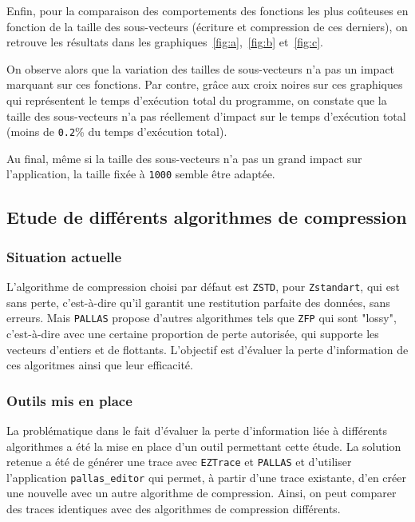 Enfin, pour la comparaison des comportements des fonctions les plus coûteuses en fonction de la taille des sous-vecteurs (écriture et compression de ces derniers),
on retrouve les résultats dans les graphiques~\ref{fig:a},~\ref{fig:b} et~\ref{fig:c}.

On observe alors que la variation des tailles de sous-vecteurs n'a pas un impact marquant sur ces fonctions. Par contre, grâce aux croix noires sur ces graphiques qui représentent le temps d'exécution total du programme,
on constate que la taille des sous-vecteurs n'a pas réellement d'impact sur le temps d'exécution total (moins de \verb!0.2!\% du temps d'exécution total).

Au final, même si la taille des sous-vecteurs n'a pas un grand impact sur l'application, la taille fixée à \verb!1000! semble être adaptée.


\clearpage


\subsection{Etude de différents algorithmes de compression}\label{ssec:comp}
\subsubsection{Situation actuelle}\label{ssec:comp_situ}

L'algorithme de compression choisi par défaut est \verb!ZSTD!\cite{zstd}, pour \verb!Zstandart!, qui est sans perte, c'est-à-dire qu'il garantit une restitution parfaite des données, sans erreurs.
Mais \verb!PALLAS! propose d'autres algorithmes tels que \verb!ZFP!\cite{zfp} qui sont "lossy", c'est-à-dire avec une certaine proportion de perte autorisée, qui supporte les vecteurs d'entiers et de flottants.
L'objectif est d'évaluer la perte d'information de ces algoritmes ainsi que leur efficacité.

\subsubsection{Outils mis en place}\label{ssec:comp_tools}

La problématique dans le fait d'évaluer la perte d'information liée à différents algorithmes a été la mise en place d'un outil permettant cette étude.
La solution retenue a été de générer une trace avec \verb!EZTrace! et \verb!PALLAS! et d'utiliser l'application \verb!pallas_editor! qui permet, à partir d'une trace
existante, d'en créer une nouvelle avec un autre algorithme de compression. Ainsi, on peut comparer des traces identiques avec des algorithmes de compression différents.

